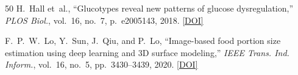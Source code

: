 \documentclass[conference]{IEEEtran}
\begin{document}
\begin{thebibliography}{50}
 H.~Hall et~al., ``Glucotypes reveal new patterns of glucose dysregulation,'' \emph{PLOS Biol.}, vol.~16, no.~7, p.~e2005143, 2018. \href{https://doi.org/10.1371/journal.pbio.2005143}{[DOI]}

 F.~P.~W.~Lo, Y.~Sun, J.~Qiu, and P.~Lo, ``Image-based food portion size estimation using deep learning and 3D surface modeling,'' \emph{IEEE Trans. Ind. Inform.}, vol.~16, no.~5, pp.~3430--3439, 2020. \href{https://doi.org/10.1109/TII.2019.2936744}{[DOI]}

\end{thebibliography}
\end{document}
